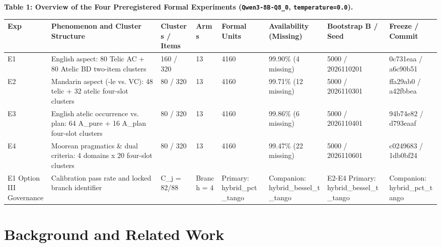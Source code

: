 \documentclass[11pt,a4paper]{article}
\begin{document}
\textbf{Table 1: Overview of the Four Preregistered Formal Experiments (\texttt{Qwen3-\allowbreak{}8B-\allowbreak{}Q8\_\allowbreak{}0}, \texttt{temperature=\allowbreak{}0.0}).}

\begin{center}\begingroup\small\setlength{\tabcolsep}{4.5pt}\renewcommand{\arraystretch}{1.12}\begin{adjustbox}{max width=\textwidth}\begin{tabular}{llllllll}\toprule
\textbf{Exp} & \textbf{Phenomenon and Cluster Structure} & \textbf{Clusters / Items} & \textbf{Arms} & \textbf{Formal Units} & \textbf{Availability (Missing)} & \textbf{Bootstrap B / Seed} & \textbf{Freeze / Commit} \\ \midrule
E1 & English aspect: 80 Telic AC + 80 Atelic BD two-item clusters & 160 / 320 & 13 & 4160 & 99.90\% (4 missing) & 5000 / 2026110201 & 0c731eaa / a6c90b51 \\
E2 & Mandarin aspect (-le vs. VC): 48 telic + 32 atelic four-slot clusters & 80 / 320 & 13 & 4160 & 99.71\% (12 missing) & 5000 / 2026110301 & ffa29ab0 / a42fbbea \\
E3 & English atelic occurrence vs. plan: 64 A\_\allowbreak{}pure + 16 A\_\allowbreak{}plan four-slot clusters & 80 / 320 & 13 & 4160 & 99.86\% (6 missing) & 5000 / 2026110401 & 94b74e82 / d793eaaf \\
E4 & Moorean pragmatics \& dual criteria: 4 domains x 20 four-slot clusters & 80 / 320 & 13 & 4160 & 99.47\% (22 missing) & 5000 / 2026110601 & c0249683 / 1db0bf24 \\
E1 Option III Governance & Calibration pass rate and locked branch identifier & C\_\allowbreak{}j = 82/88 & Branch = 4 & Primary: hybrid\_\allowbreak{}pct\_\allowbreak{}tango & Companion: hybrid\_\allowbreak{}bessel\_\allowbreak{}t\_\allowbreak{}tango & E2-E4 Primary: hybrid\_\allowbreak{}bessel\_\allowbreak{}t\_\allowbreak{}tango & Companion: hybrid\_\allowbreak{}pct\_\allowbreak{}tango \\
\bottomrule\end{tabular}\end{adjustbox}\endgroup\end{center}


\section{Background and Related Work}
\end{document}
